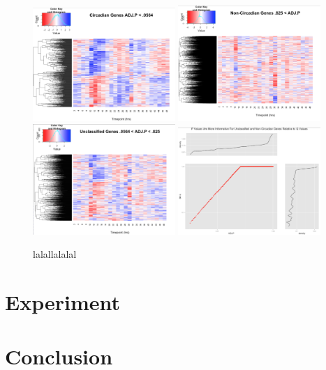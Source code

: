 \documentclass[prl,amsmath,amssymb,floatfix,superscriptaddress,notitlepage,twocolumn]{revtex4}
\begin{document}
\begin{figure}
\centering
\vfill
\includegraphics[width=0.48\textwidth]{Circadian.png}\hfill
\includegraphics[width=0.48\textwidth]{Non-Circadian.png} 
\\
\includegraphics[width=0.48\textwidth]{Unclassified.png} \hfill
\includegraphics[width=0.48\textwidth]{PvsQ.png} 
\caption{lalallalalal}
\vfill
\end{figure}
\section{Experiment}

\section{Conclusion}



\end{document}
